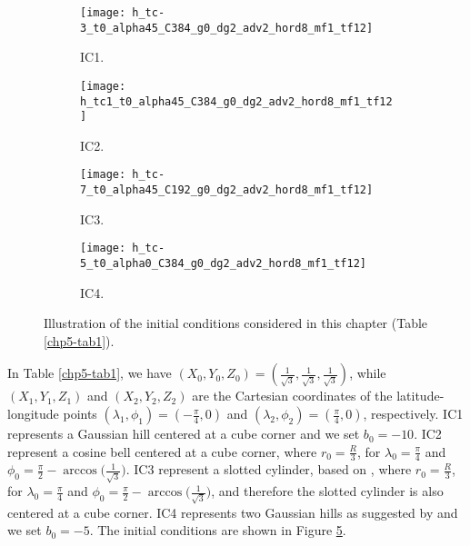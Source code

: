 \begin{figure}[!htb]
	\centering
	\begin{subfigure}{0.45\textwidth}
		\centering
		\texttt{[image: h\_tc-3\_t0\_alpha45\_C384\_g0\_dg2\_adv2\_hord8\_mf1\_tf12]}
		\caption{IC1. \label{chp5-ic1}}
	\end{subfigure}
	\begin{subfigure}{0.45\textwidth}
		\centering
		\texttt{[image: h\_tc1\_t0\_alpha45\_C384\_g0\_dg2\_adv2\_hord8\_mf1\_tf12]}
		\caption{IC2. \label{chp5-ic2}}
	\end{subfigure}

	\begin{subfigure}{0.45\textwidth}
	\centering
	\texttt{[image: h\_tc-7\_t0\_alpha45\_C192\_g0\_dg2\_adv2\_hord8\_mf1\_tf12]}
	\caption{IC3. \label{chp5-ic3}}
    \end{subfigure}
    \begin{subfigure}{0.45\textwidth}
	\centering
	\texttt{[image: h\_tc-5\_t0\_alpha0\_C384\_g0\_dg2\_adv2\_hord8\_mf1\_tf12]}
	\caption{IC4. \label{chp5-ic4}}
    \end{subfigure}
	\caption{ Illustration of the initial conditions considered in this chapter (Table \ref{chp5-tab1}).\label{chp5-ic}}
\end{figure}


In Table \ref{chp5-tab1}, we have $(X_0,Y_0,Z_0)=(\frac{1}{\sqrt{3}},\frac{1}{\sqrt{3}},\frac{1}{\sqrt{3}})$, while 
$(X_1,Y_1,Z_1)$ and $(X_2,Y_2,Z_2)$ are the Cartesian coordinates of the latitude-longitude points
$(\lambda_1,\phi_1) = (-\frac{\pi}{4},0)$ and
$(\lambda_2,\phi_2) = ( \frac{\pi}{4},0)$, respectively.
IC1 represents a Gaussian hill centered at a cube corner and we set $b_0 = -10$.
IC2 represent a cosine bell centered at a cube corner, where $r_0 = \frac{R}{3}$, 
for $\lambda_0=\frac{\pi}{4}$ and $\phi_0 = \frac{\pi}{2}-\arccos{\big(\frac{1}{\sqrt{3}}\big)}$.
IC3 represent a slotted cylinder, based on  \citet{nair:2010}, where $r_0 = \frac{R}{3}$, 
for $\lambda_0=\frac{\pi}{4}$ and $\phi_0 = \frac{\pi}{2}-\arccos{\big(\frac{1}{\sqrt{3}}\big)}$,
and therefore the slotted cylinder is also centered at a cube corner.
IC4 represents two Gaussian hills as suggested by \citet{nair:2010} and we set $b_0 = -5$.
The initial conditions are shown in Figure \ref{chp5-ic}.

